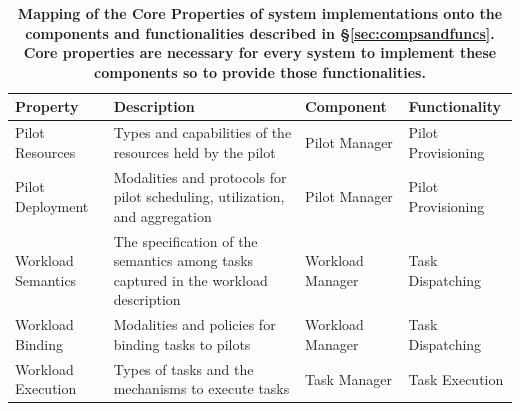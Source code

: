 \documentclass{sig-alternate}
\begin{document}
\begin{table}
\centering
\begin{tabular}{p{3.6cm}p{5cm}p{2.7cm}p{2.7cm}}

\toprule

\textbf{Property} &
\textbf{Description} &
\textbf{Component} &
\textbf{Functionality} \\

\midrule

Pilot Resources &
Types and capabilities of the resources held by the pilot &
Pilot Manager &
Pilot Provisioning \\

Pilot Deployment &
Modalities and protocols for pilot scheduling, utilization, and aggregation &
Pilot Manager &
Pilot Provisioning \\

Workload Semantics &
The specification of the semantics among tasks captured in the workload
description &
Workload Manager &
Task Dispatching \\

Workload Binding&
Modalities and policies for binding tasks to pilots &
Workload Manager&
Task Dispatching \\

Workload Execution &
Types of tasks and the mechanisms to execute tasks &
Task Manager &
Task Execution \\

\bottomrule

\end{tabular}
\caption{\textbf{Mapping of the Core Properties of \pilot system implementations
  onto the components and functionalities described in
  \S\ref{sec:compsandfuncs}. Core properties are necessary for every \pilot
  system to implement these components so to provide those functionalities. } }
\label{table:core_properties}
\end{table}
\end{document}
